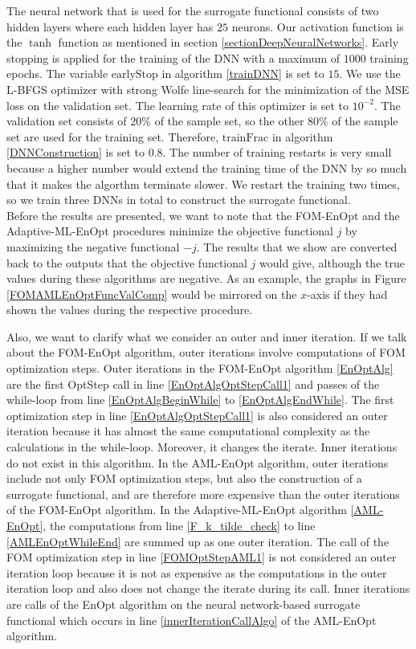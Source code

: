 The neural network that is used for the surrogate functional consists of two hidden layers where each hidden layer has $25$ neurons. Our activation function is the $\tanh$ function as mentioned in section \ref{sectionDeepNeuralNetworks}. Early stopping is applied for the training of the DNN with a maximum of $1000$ training epochs. The variable $\mathrm{earlyStop}$ in algorithm \ref{trainDNN} is set to $15$. We use the L-BFGS optimizer with strong Wolfe line-search for the minimization of the MSE loss on the validation set. The learning rate of this optimizer is set to $10^{-2}$. The validation set consists of $20\%$ of the sample set, so the other $80\%$ of the sample set are used for the training set. Therefore, $\mathrm{trainFrac}$ in algorithm \ref{DNNConstruction} is set to $0.8$. The number of training restarts is very small because a higher number would extend the training time of the DNN by so much that it makes the algorthm terminate slower. We restart the training two times, so we train three DNNs in total to construct the surrogate functional.\\

Before the results are presented, we want to note that the FOM-EnOpt and the Adaptive-ML-EnOpt procedures minimize the objective functional $j$ by maximizing the negative functional $-j$. The results that we show are converted back to the outputs that the objective functional $j$ would give, although the true values during these algorithms are negative. As an example, the graphs in Figure \ref{FOMAMLEnOptFuncValComp} would be mirrored on the $x$-axis if they had shown the values during the respective procedure.

Also, we want to clarify what we consider an outer and inner iteration. If we talk about the FOM-EnOpt algorithm, outer iterations involve computations of FOM optimization steps. Outer iterations in the FOM-EnOpt algorithm \ref{EnOptAlg} are the first OptStep call in line \ref{EnOptAlgOptStepCall1} and passes of the while-loop from line \ref{EnOptAlgBeginWhile} to \ref{EnOptAlgEndWhile}. The first optimization step in line \ref{EnOptAlgOptStepCall1} is also considered an outer iteration because it has almost the same computational complexity as the calculations in the while-loop. Moreover, it changes the iterate. Inner iterations do not exist in this algorithm. In the AML-EnOpt algorithm, outer iterations include not only FOM optimization steps, but also the construction of a surrogate functional, and are therefore more expensive than the outer iterations of the FOM-EnOpt algorithm. In the Adaptive-ML-EnOpt algorithm \ref{AML-EnOpt}, the computations from line \ref{F_k_tilde_check} to line \ref{AMLEnOptWhileEnd} are summed up as one outer iteration. The call of the FOM optimization step in line \ref{FOMOptStepAML1} is not considered an outer iteration loop because it is not as expensive as the computations in the outer iteration loop and also does not change the iterate during its call. Inner iterations are calls of the EnOpt algorithm on the neural network-based surrogate functional which occurs in line \ref{innerIterationCallAlgo} of the AML-EnOpt algorithm.

